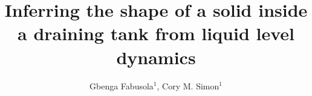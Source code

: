 \documentclass[openacc]{rsproca_new}%
\begin{document}
\title{Inferring the shape of a solid inside a draining tank from liquid level dynamics}


\author{%
Gbenga Fabusola$^{1}$, 
Cory M. Simon$^{1}$
}

\address{$^{1}$School of Chemical, Biological, and Environmental Engineering. Oregon State University. Corvallis, OR, USA.
}

\subject{applied mathematics, chemical engineering}


\end{document}
